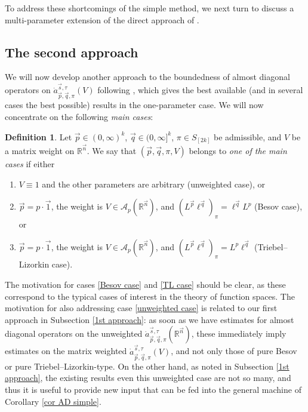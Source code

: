 \documentclass[11pt, reqno]{amsart}
\theoremstyle{definition}
\newtheorem{definition}[theorem]{Definition}
\theoremstyle{remark}
\numberwithin{equation}{section}
\newcommand{\A}{\mathscr A}
\newcommand{\R}{\mathbb R}
\newcommand{\vone}{\vec 1}
\newcommand{\vn}{\vec n}
\newcommand{\vp}{\vec p}
\newcommand{\vq}{\vec q}
\newcommand{\vs}{\vec s}
\newcommand{\atau}{\dot a^{\vs,\tau}_{\vp,\vq,\pi}}
\begin{document}
To address these shortcomings of the simple method, we next turn to discuss a multi-parameter extension of the direct approach of \cite{BHYY:1b}.

\subsection{The second approach}\label{2nd approach}

We will now develop another approach to the boundedness of almost diagonal operators on $\atau(V)$ following \cite{BHYY:1b}, which gives the best available (and in several cases the best possible) results in the one-parameter case. We will now concentrate on the following {\em main cases}:

\begin{definition}\label{main cases}
Let $\vp\in(0,\infty)^k$, $\vq\in(0,\infty]^k$, $\pi\in S_{[2k]}$ be admissible, and $V$ be a matrix weight on $\R^{\vn}$. We say that $(\vp,\vq,\pi,V)$ belongs to {\em one of the main cases} if
either
\begin{enumerate}[\rm(i)]
\item\label{unweighted case} $V\equiv 1$ and the other parameters are arbitrary (unweighted case), or

\item\label{Besov case} $\vp=p\cdot\vone$, the weight is $V\in\A_p(\R^{\vn})$, and $(L^{\vp}\ell^{\vq})_\pi =\ell^{\vq}L^p$ (Besov case), or

\item\label{TL case} $\vp=p\cdot\vone$, the weight is $V\in\A_p(\R^{\vn})$, and $(L^{\vp}\ell^{\vq})_\pi =L^p\ell^{\vq}$ (Triebel--Lizorkin case).
\end{enumerate}
\end{definition}

The motivation for cases \eqref{Besov case} and \eqref{TL case} should be clear, as these correspond to the typical cases of interest in the theory of function spaces. The motivation for also addressing case \eqref{unweighted case} is related to our
first approach in Subsection \ref{1st approach}: as soon as we have estimates for almost diagonal operators on the unweighted $\atau(\R^{\vn})$, these immediately imply estimates on the matrix weighted $\atau(V)$, and not only those of pure Besov or pure Triebel--Lizorkin-type. On the other hand, as noted in Subsection \ref{1st approach}, the existing results even this unweighted case are not so many, and thus it is useful to provide new input that can be fed into the general machine of Corollary \ref{cor AD simple}.
\end{document}
